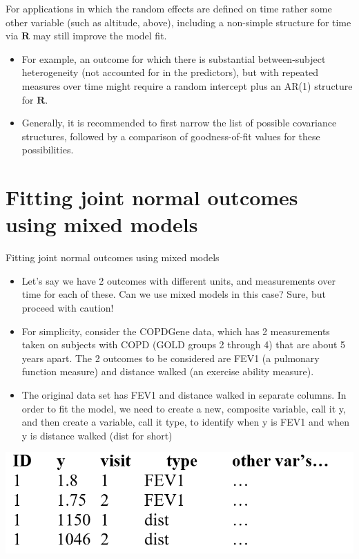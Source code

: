 \documentclass[
  9pt,
  ignorenonframetext,
]{beamer}
\begin{document}
\begin{frame}{}
\protect\hypertarget{section-4}{}
For applications in which the random effects are defined on time rather
some other variable (such as altitude, above), including a non-simple
structure for time via \(\pmb R\) may still improve the model fit.

\begin{itemize}
\item
  For example, an outcome for which there is substantial between-subject
  heterogeneity (not accounted for in the predictors), but with repeated
  measures over time might require a random intercept plus an AR(1)
  structure for \(\pmb R\).
\item
  Generally, it is recommended to first narrow the list of possible
  covariance structures, followed by a comparison of goodness-of-fit
  values for these possibilities.
\end{itemize}
\end{frame}

\hypertarget{fitting-joint-normal-outcomes-using-mixed-models}{%
\section{Fitting joint normal outcomes using mixed
models}\label{fitting-joint-normal-outcomes-using-mixed-models}}

\begin{frame}{Fitting joint normal outcomes using mixed models}
\protect\hypertarget{fitting-joint-normal-outcomes-using-mixed-models-1}{}
\begin{itemize}
\item
  Let's say we have 2 outcomes with different units, and measurements
  over time for each of these. Can we use mixed models in this case?
  Sure, but proceed with caution!
\item
  For simplicity, consider the COPDGene data, which has 2 measurements
  taken on subjects with COPD (GOLD groups 2 through 4) that are about 5
  years apart. The 2 outcomes to be considered are FEV1 (a pulmonary
  function measure) and distance walked (an exercise ability measure).
\item
  The original data set has FEV1 and distance walked in separate
  columns. In order to fit the model, we need to create a new, composite
  variable, call it y, and then create a variable, call it type, to
  identify when y is FEV1 and when y is distance walked (dist for short)
\end{itemize}

\begin{center}\includegraphics[width=0.5\linewidth]{figs_L8/f4} \end{center}
\end{frame}
\end{document}

